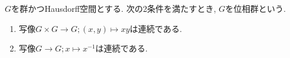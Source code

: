 
$G$を群かつHausdorff空間とする.
次の2条件を満たすとき, $G$を位相群という.

\begin{enumerate}
    \item 写像$G\times G\to G; (x,y)\mapsto xy$は連続である.
    \item 写像$G\to G; x\mapsto x^{-1}$は連続である.
\end{enumerate}
